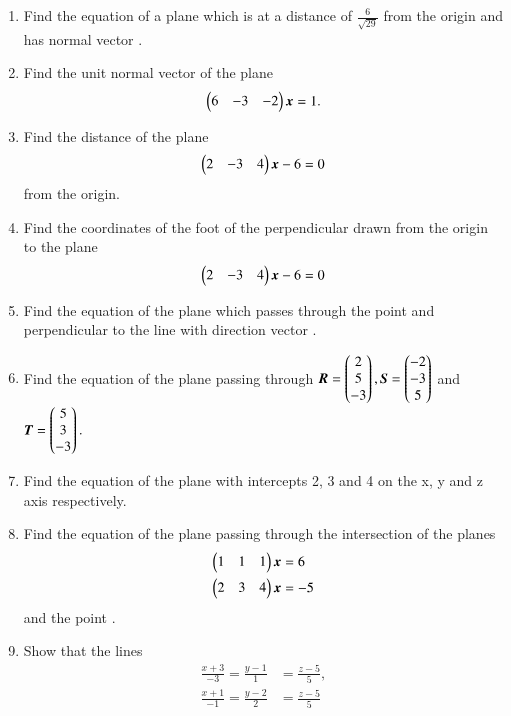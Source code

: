 \begin{enumerate}[label=\arabic*.,ref=\thesubsection.\theenumi]
%
\item Find the equation of a plane which is at a distance of $\frac{6}{\sqrt{29}}$ from the origin and has  normal vector .
\item Find the unit normal vector of the plane 
\begin{align}
\begin{pmatrix}6 & -3 & -2\end{pmatrix}\bm{x}  = 1.
\end{align}
\item Find the distance of the plane 
\begin{align}
\begin{pmatrix}2 & -3 & 4\end{pmatrix}\bm{x}-6  = 0
\end{align}
%
from the origin.
\item Find the coordinates of the foot of the perpendicular drawn from the origin to the plane 
\begin{align}
\begin{pmatrix}2 & -3 & 4\end{pmatrix}\bm{x}-6  = 0
\end{align}
%
\item Find the equation of the plane which passes through the point  and perpendicular to the line with direction vector .
\item Find the equation of the plane passing through 
$
\bm{R} = \begin{pmatrix}2\\5\\-3\end{pmatrix},
\bm{S}= \begin{pmatrix}-2\\-3\\5\end{pmatrix}
$ 
and 
$
\bm{T}= \begin{pmatrix}5\\3\\-3\end{pmatrix}.
$
\item Find the equation of the plane with intercepts 2, 3 and 4 on the x, y and z axis respectively.
\item Find the equation of the plane passing through the intersection of the planes 
\begin{align}
\begin{pmatrix}1 & 1 & 1\end{pmatrix}\bm{x}&=6  
\\
\begin{pmatrix}2 & 3 & 4\end{pmatrix}\bm{x}&=-5
\end{align}
%
and the point .
\item Show that the lines 
\begin{align}
\frac{x+3}{-3} = \frac{y-1}{1} &= \frac{z-5}{5}, 
\\
\frac{x+1}{-1} = \frac{y-2}{2} &= \frac{z-5}{5} 

\end{align}
\end{enumerate}
